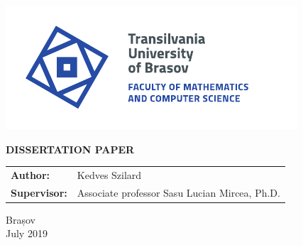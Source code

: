 \begin{titlepage}
	
	\vspace*{-3cm}
	\hspace{-2cm}
	\includegraphics[width=0.8\linewidth]{./images/Logo-UT-MI-SPOT-EN}

	\begin{center}
		\Huge
		
		\vspace{2cm}
		
		\textbf{DISSERTATION PAPER}
		
		\vfill
				
		\Large
		\begin{tabular}{ll}
			\textbf{Author:}&Kedves Szilard\\
			\textbf{Supervisor:}&Associate professor Sasu Lucian Mircea, Ph.D.
		\end{tabular}
		
		\vfill
		
		\Large
		Brașov\\
		July 2019
        
	\end{center}
\end{titlepage}